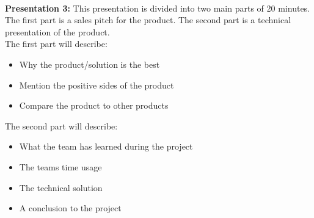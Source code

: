 \\
\textbf{Presentation 3:}
This presentation is divided into two main parts of 20 minutes. The first part is a sales pitch for the product. The second part is a technical presentation of the product. \\
The first part will describe:
\begin{itemize}
  \item Why the product/solution is the best 
  \item Mention the positive sides of the product
  \item Compare the product to other products 
\end{itemize}
The second part will describe: 
\begin{itemize}
  \item What the team has learned during the project 
  \item The teams time usage 
  \item The technical solution
  \item A conclusion to the project 
\end{itemize} 

